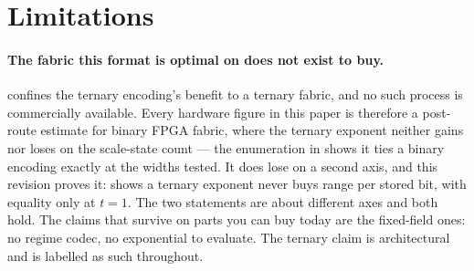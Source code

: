 \section{Limitations}\label{sec:limitations-anchor}\label{sec:limits}

\paragraph{The fabric this format is optimal on does not exist to buy.}
 confines the ternary encoding's benefit to a ternary
fabric, and no such process is commercially available. Every hardware figure in
this paper is therefore a post-route estimate for binary FPGA fabric, where the
ternary exponent neither gains nor loses on the scale-state count --- the
enumeration in  shows it ties a binary encoding
exactly at the widths tested. It does lose on a second axis, and this revision
proves it:  shows a ternary exponent never buys range
per stored bit, with equality only at $t=1$. The two statements are about
different axes and both hold. The claims that survive on parts you can buy today are the fixed-field
ones: no regime codec, no exponential to
evaluate. The ternary claim is architectural and is labelled as such throughout.

